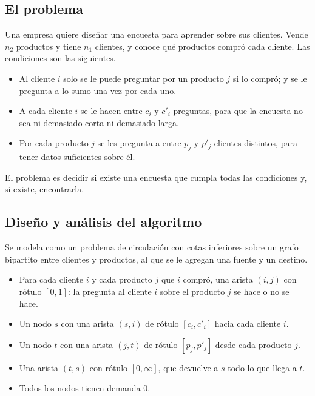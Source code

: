 \documentclass[12pt, spanish, oneside, openany]{book}
\theoremstyle{uprightplain}
\theoremstyle{definition}
\theoremstyle{remark}
\theoremstyle{definition}
\begin{document}
\subsection{El problema}

Una empresa quiere diseñar una encuesta para aprender sobre sus clientes. Vende $n_2$ productos y tiene $n_1$ clientes, y conoce qué productos compró cada cliente. Las condiciones son las siguientes.
\begin{itemize}
    \item Al cliente $i$ solo se le puede preguntar por un producto $j$ si lo compró; y se le pregunta a lo sumo una vez por cada uno.
    \item A cada cliente $i$ se le hacen entre $c_i$ y $c'_i$ preguntas, para que la encuesta no sea ni demasiado corta ni demasiado larga.
    \item Por cada producto $j$ se les pregunta a entre $p_j$ y $p'_j$ clientes distintos, para tener datos suficientes sobre él.
\end{itemize}
El problema es decidir si existe una encuesta que cumpla todas las condiciones y, si existe, encontrarla.

\subsection{Diseño y análisis del algoritmo}

Se modela como un problema de circulación con cotas inferiores sobre un grafo bipartito entre clientes y productos, al que se le agregan una fuente y un destino.
\begin{itemize}
    \item Para cada cliente $i$ y cada producto $j$ que $i$ compró, una arista $(i,j)$ con rótulo $[0,1]$: la pregunta al cliente $i$ sobre el producto $j$ se hace o no se hace.
    \item Un nodo $s$ con una arista $(s,i)$ de rótulo $[c_i,c'_i]$ hacia cada cliente $i$.
    \item Un nodo $t$ con una arista $(j,t)$ de rótulo $[p_j,p'_j]$ desde cada producto $j$.
    \item Una arista $(t,s)$ con rótulo $[0,\infty]$, que devuelve a $s$ todo lo que llega a $t$.
    \item Todos los nodos tienen demanda $0$.
\end{itemize}
\end{document}
